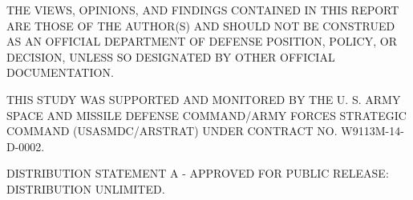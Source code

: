\bigskip

\vfill

\begin{small}
\textsf{
THE VIEWS, OPINIONS, AND FINDINGS CONTAINED IN THIS REPORT ARE THOSE OF THE AUTHOR(S) AND SHOULD NOT BE CONSTRUED AS AN OFFICIAL DEPARTMENT OF DEFENSE POSITION, POLICY, OR DECISION, UNLESS SO DESIGNATED BY OTHER OFFICIAL DOCUMENTATION.
}

\textsf{
THIS STUDY WAS SUPPORTED AND MONITORED BY THE U. S. ARMY SPACE AND MISSILE DEFENSE COMMAND/ARMY FORCES STRATEGIC COMMAND (USASMDC/ARSTRAT) UNDER CONTRACT NO. W9113M-14-D-0002.
}

\textsf{
DISTRIBUTION STATEMENT A - APPROVED FOR PUBLIC RELEASE: DISTRIBUTION UNLIMITED.
}
\end{small}

